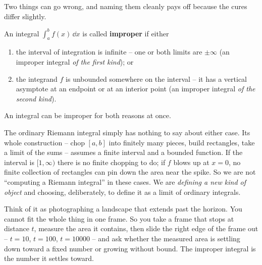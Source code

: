 Two things can go wrong, and naming them cleanly pays off because the cures
differ slightly.

\begin{definition}
\label{ch25:def-improper}
An integral $\int_a^b f(x)\,\dd x$ is called \textbf{improper} if either
\begin{enumerate}
  \item the interval of integration is infinite -- one or both limits are
  $\pm\infty$ (an improper integral \emph{of the first kind}); or
  \item the integrand $f$ is unbounded somewhere on the interval -- it has a
  vertical asymptote at an endpoint or at an interior point (an improper integral
  \emph{of the second kind}).
\end{enumerate}
An integral can be improper for both reasons at once.
\end{definition}

The ordinary Riemann integral simply has nothing to say about either case. Its
whole construction -- chop $[a,b]$ into finitely many pieces, build rectangles,
take a limit of the sums -- assumes a finite interval and a bounded function. If
the interval is $[1,\infty)$ there is no finite chopping to do; if $f$ blows up at
$x=0$, no finite collection of rectangles can pin down the area near the spike.
So we are not ``computing a Riemann integral'' in these cases. We are
\emph{defining a new kind of object} and choosing, deliberately, to define it as a
limit of ordinary integrals.

\begin{intuitionbox}
Think of it as photographing a landscape that extends past the horizon. You
cannot fit the whole thing in one frame. So you take a frame that stops at
distance $t$, measure the area it contains, then slide the right edge of the frame
out -- $t = 10$, $t = 100$, $t = 10000$ -- and ask whether the measured area is
settling down toward a fixed number or growing without bound. The improper
integral is the number it settles toward.
\end{intuitionbox}

